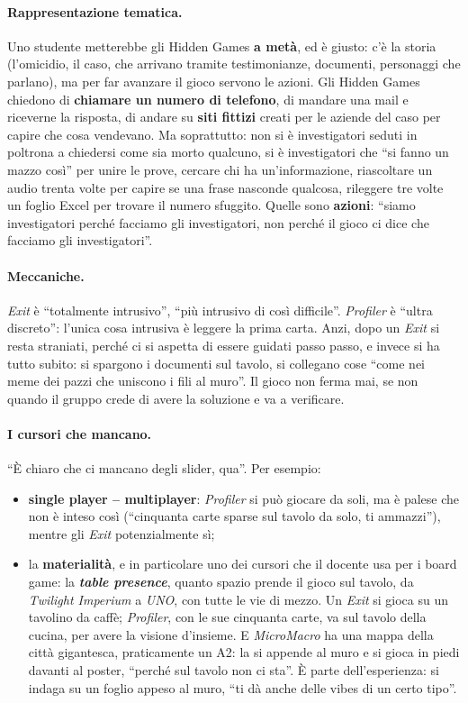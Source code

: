 \paragraph{Rappresentazione tematica.} Uno studente metterebbe gli Hidden Games
\textbf{a metà}, ed è giusto: c'è la storia (l'omicidio, il caso, che arrivano
tramite testimonianze, documenti, personaggi che parlano), ma per far avanzare il
gioco servono le azioni. Gli Hidden Games chiedono di \textbf{chiamare un numero
di telefono}, di mandare una mail e riceverne la risposta, di andare su
\textbf{siti fittizi} creati per le aziende del caso per capire che cosa
vendevano. Ma soprattutto: non si è investigatori seduti in poltrona a chiedersi
come sia morto qualcuno, si è investigatori che ``si fanno un mazzo così'' per
unire le prove, cercare chi ha un'informazione, riascoltare un audio trenta volte
per capire se una frase nasconde qualcosa, rileggere tre volte un foglio Excel
per trovare il numero sfuggito. Quelle sono \textbf{azioni}: ``siamo
investigatori perché facciamo gli investigatori, non perché il gioco ci dice che
facciamo gli investigatori''.

\paragraph{Meccaniche.} \emph{Exit} è ``totalmente intrusivo'', ``più intrusivo di
così difficile''. \emph{Profiler} è ``ultra discreto'': l'unica cosa intrusiva è
leggere la prima carta. Anzi, dopo un \emph{Exit} si resta straniati, perché ci
si aspetta di essere guidati passo passo, e invece si ha tutto subito: si
spargono i documenti sul tavolo, si collegano cose ``come nei meme dei pazzi che
uniscono i fili al muro''. Il gioco non ferma mai, se non quando il gruppo crede
di avere la soluzione e va a verificare.

\paragraph{I cursori che mancano.} ``È chiaro che ci mancano degli slider, qua''.
Per esempio:
\begin{itemize}
  \item \textbf{single player -- multiplayer}: \emph{Profiler} si può giocare da
        soli, ma è palese che non è inteso così (``cinquanta carte sparse sul
        tavolo da solo, ti ammazzi''), mentre gli \emph{Exit} potenzialmente sì;
  \item la \textbf{materialità}, e in particolare uno dei cursori che il docente
        usa per i board game: la \textbf{\emph{table presence}}, quanto spazio
        prende il gioco sul tavolo, da \emph{Twilight Imperium} a \emph{UNO}, con
        tutte le vie di mezzo. Un \emph{Exit} si gioca su un tavolino da caffè;
        \emph{Profiler}, con le sue cinquanta carte, va sul tavolo della cucina,
        per avere la visione d'insieme. E \emph{MicroMacro} ha una mappa della
        città gigantesca, praticamente un A2: la si appende al muro e si gioca in
        piedi davanti al poster, ``perché sul tavolo non ci sta''. È parte
        dell'esperienza: si indaga su un foglio appeso al muro, ``ti dà anche
        delle vibes di un certo tipo''.
\end{itemize}


